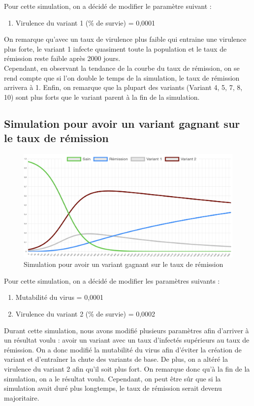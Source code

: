 \documentclass{article}
\begin{document}
Pour cette simulation, on a décidé de modifier le paramètre suivant :
\begin{enumerate}
    \item Virulence du variant 1 (\% de survie) = 0,0001 \\
\end{enumerate}

\noindent
On remarque qu'avec un taux de virulence plus faible qui entraine une virulence plus forte, le variant 1 infecte quasiment toute la population et le taux de rémission reste faible après 2000 jours. \\ Cependant, en observant la tendance de la courbe du taux de rémission, on se rend compte que si l'on double le temps de la simulation, le taux de rémission arrivera à 1.
Enfin, on remarque que la plupart des variants (Variant 4, 5, 7, 8, 10) sont plus forts que le variant parent à la fin de la simulation. \\

\subsection{Simulation pour avoir un variant gagnant sur le taux de rémission}

\begin{figure}[h]
    \includegraphics[width=\linewidth]{images/Simulation5.png}
    \caption{Simulation pour avoir un variant gagnant sur le taux de rémission}
    \label{fig:simulation5}
\end{figure}

Pour cette simulation, on a décidé de modifier les paramètres suivants :
\begin{enumerate}
    \item Mutabilité du virus = 0,0001
    \item Virulence du variant 2 (\% de survie) = 0,0002
\end{enumerate}
\noindent
Durant cette simulation, nous avons modifié plusieurs paramètres afin d'arriver à un résultat voulu : avoir un variant avec un taux d'infectés supérieurs au taux de rémission. On a donc modifié la mutabilité du virus afin d'éviter la création de variant et d'entraîner la chute des variants de base. De plus, on a altéré la virulence du variant 2 afin qu'il soit plus fort. On remarque donc qu'à la fin de la simulation, on a le résultat voulu. Cependant, on peut être sûr que si la simulation avait duré plus longtemps, le taux de rémission serait devenu majoritaire.
\end{document}
